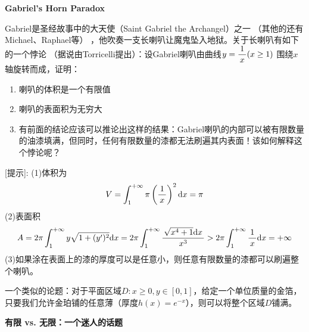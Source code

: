 \begin{shaded}
	{\bf Gabriel's Horn Paradox}
	
	\begin{center}
	\end{center}
	
	Gabriel是圣经故事中的大天使（Saint Gabriel the Archangel）之一
	（其他的还有Michael、Raphael等）
	，他吹奏一支长喇叭让魔鬼坠入地狱。关于长喇叭有如下的一个悖论
	（据说由Torricelli提出）：设Gabriel喇叭由曲线$y=\displaystyle\frac{\,{1}\,}{\,{x}\,}(x\geq 1)$
	围绕$x$轴旋转而成，证明：
	\begin{enumerate} [(1)]
  	  \setlength{\itemindent}{1cm}
	  \item 喇叭的体积是一个有限值
	  \item 喇叭的表面积为无穷大
	  \item 有前面的结论应该可以推论出这样的结果：Gabriel喇叭的内部可以被有限数量
	  的油漆填满，但同时，任何有限数量的漆都无法刷遍其内表面！该如何解释这个悖论呢？
	\end{enumerate}
	[提示]:
	(1)体积为
	$$V=\displaystyle\int_1^{+\infty}\pi\left(\displaystyle\frac{\,{1}\,}{\,{x}\,}\right)^2\mathrm{d} x=\pi$$
	(2)表面积
	$$A=2\pi\displaystyle\int_1^{+\infty}y\sqrt{1+(y')^2}\mathrm{d} x=2\pi\displaystyle\int_1^{+\infty}
	\displaystyle\frac{\,{\sqrt{x^4+1}\mathrm{d} x}\,}{\,{x^3}\,}>2\pi\displaystyle\int_1^{+\infty}\displaystyle\frac{\,{1}\,}{\,{x}\,}\mathrm{d} x=+\infty$$
	(3)如果涂在表面上的漆的厚度可以是任意小，则任意有限数量的漆都可以刷遍整个喇叭。
	
	一个类似的论题：对于平面区域$D:x\geq0,y\in[0,1]$，给定一个单位质量的金箔，
	只要我们允许金珀铺的任意薄（厚度$h(x)=e^{-x}$），则可以将整个区域$D$铺满。
	
	{\bf 有限 vs. 无限：一个迷人的话题}
	

\end{shaded}
